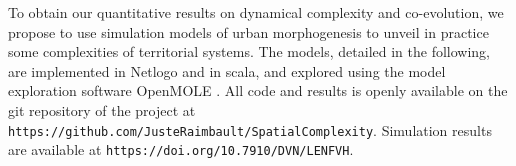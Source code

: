 \documentclass[fleqn,10pt]{wlscirep}
\begin{document}
To obtain our quantitative results on dynamical complexity and co-evolution, we propose to use simulation models of urban morphogenesis to unveil in practice some complexities of territorial systems. The models, detailed in the following, are implemented in Netlogo \cite{wilensky1999netlogo} and in scala, and explored using the model exploration software OpenMOLE \cite{reuillon2013openmole}. All code and results is openly available on the git repository of the project at \texttt{https://github.com/JusteRaimbault/SpatialComplexity}. Simulation results are available at \texttt{https://doi.org/10.7910/DVN/LENFVH}.













\end{document}
